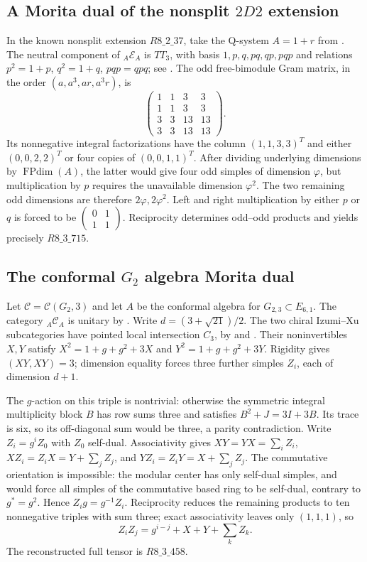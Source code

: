 \subsection{A Morita dual of the nonsplit $2D2$ extension}
In the known nonsplit extension $R8\_2\_37$, take the Q-system $A=1+r$ from \cite[Lemma~4.1]{Grossman}. The neutral component of ${}_A\mathcal E_A$ is $TT_3$, with basis $1,p,q,pq,qp,pqp$ and relations $p^2=1+p$, $q^2=1+q$, $pqp=qpq$; see \cite[Definition~2.5]{EdieGolden}. The odd free-bimodule Gram matrix, in the order $(a,a^3,ar,a^3r)$, is
\[
 \begin{pmatrix}1&1&3&3\\1&1&3&3\\3&3&13&13\\3&3&13&13\end{pmatrix}.
\]
Its nonnegative integral factorizations have the column $(1,1,3,3)^T$ and either $(0,0,2,2)^T$ or four copies of $(0,0,1,1)^T$. After dividing underlying dimensions by $\operatorname{FPdim}(A)$, the latter would give four odd simples of dimension $\varphi$, but multiplication by $p$ requires the unavailable dimension $\varphi^2$. The two remaining odd dimensions are therefore $2\varphi,2\varphi^2$. Left and right multiplication by either $p$ or $q$ is forced to be $\left(\begin{smallmatrix}0&1\\1&1\end{smallmatrix}\right)$. Reciprocity determines odd--odd products and yields precisely $R8\_3\_715$.

\subsection{The conformal $G_2$ algebra Morita dual}
Let $\mathcal C=\mathcal C(G_2,3)$ and let $A$ be the conformal algebra for $G_{2,3}\subset E_{6,1}$. The category ${}_A\mathcal C_A$ is unitary by \cite[Theorems~2.21,2.28, Corollary~3.32]{GuiQSystems}. Write $d=(3+\sqrt{21})/2$. The two chiral Izumi--Xu subcategories have pointed local intersection $C_3$, by \cite[Appendix~A.4]{CMS} and \cite[Section~3.3, equation~(16), Definition~3.12, Remark~3.13]{DMNO}. Their noninvertibles $X,Y$ satisfy $X^2=1+g+g^2+3X$ and $Y^2=1+g+g^2+3Y$. Rigidity gives $(XY,XY)=3$; dimension equality forces three further simples $Z_i$, each of dimension $d+1$.

The $g$-action on this triple is nontrivial: otherwise the symmetric integral multiplicity block $B$ has row sums three and satisfies $B^2+J=3I+3B$. Its trace is six, so its off-diagonal sum would be three, a parity contradiction. Write $Z_i=g^iZ_0$ with $Z_0$ self-dual. Associativity gives $XY=YX=\sum_i Z_i$, $XZ_i=Z_iX=Y+\sum_j Z_j$, and $YZ_i=Z_iY=X+\sum_j Z_j$. The commutative orientation is impossible: the modular center has only self-dual simples, and \cite[Lemma~8.49]{ENO} would force all simples of the commutative based ring to be self-dual, contrary to $g^*=g^2$. Hence $Z_ig=g^{-1}Z_i$. Reciprocity reduces the remaining products to ten nonnegative triples with sum three; exact associativity leaves only $(1,1,1)$, so
\[
 Z_iZ_j=g^{i-j}+X+Y+\sum_k Z_k.
\]
The reconstructed full tensor is $R8\_3\_458$.
